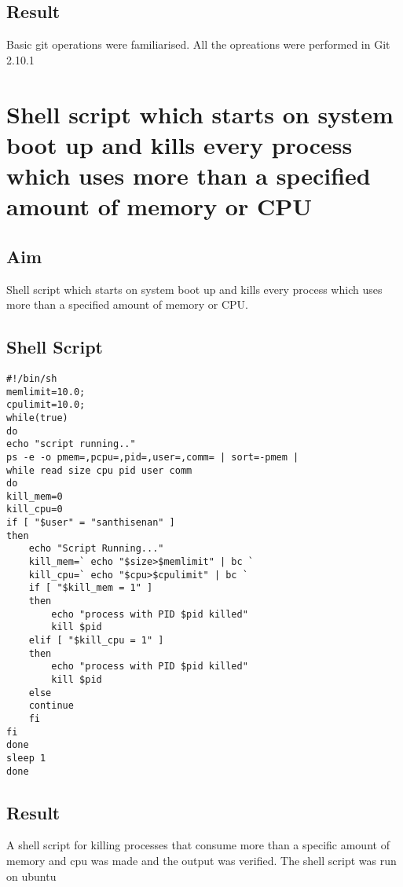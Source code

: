 \documentclass{article}
\begin{document}
\subsection{Result}

Basic git operations were familiarised. All the opreations were performed in Git 2.10.1

\begin{refsection}
\cite{gitdoc}
\cite{gitdoc1}
\printbibliography
\end{refsection}
\newpage
\section{Shell script which starts on system boot up and kills every process which uses more than a specified amount of memory or CPU}

\subsection{Aim}
Shell script which starts on system boot up and kills every process which uses more than a specified amount of memory or CPU.

\subsection{Shell Script}
\begin{verbatim}
#!/bin/sh
memlimit=10.0;
cpulimit=10.0;
while(true)
do
echo "script running.."
ps -e -o pmem=,pcpu=,pid=,user=,comm= | sort=-pmem |
while read size cpu pid user comm
do 
kill_mem=0
kill_cpu=0
if [ "$user" = "santhisenan" ]
then
    echo "Script Running..."
    kill_mem=` echo "$size>$memlimit" | bc `
    kill_cpu=` echo "$cpu>$cpulimit" | bc `
    if [ "$kill_mem = 1" ]
    then
        echo "process with PID $pid killed"
        kill $pid
    elif [ "$kill_cpu = 1" ]
    then
        echo "process with PID $pid killed"
        kill $pid
    else
    continue
    fi
fi
done
sleep 1
done

\end{verbatim}



\subsection{Result}
A shell script for killing processes that consume more than a specific amount of memory and cpu was made and the output was verified. The shell script was run on ubuntu
\end{document}

